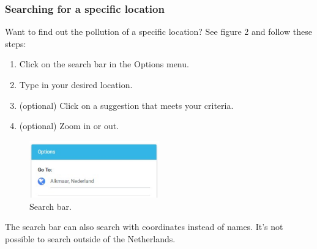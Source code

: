 \documentclass[a4paper]{article}
\begin{document}
\subsubsection*{Searching for a specific location}
Want to find out the pollution of a specific location? See figure 2 and follow these steps:
\begin{enumerate}
\item Click on the search bar in the Options menu.
\item Type in your desired location.
\item (optional) Click on a suggestion that meets your criteria.
\item (optional) Zoom in or out.
\end{enumerate}
\begin{figure}[h!]
  \caption{Search bar.}
  \centering
  \includegraphics[width=0.5\textwidth]{search}
\end{figure}
The search bar can also search with coordinates instead of names. It's not possible to search outside of the Netherlands.
\newline
\end{document}
